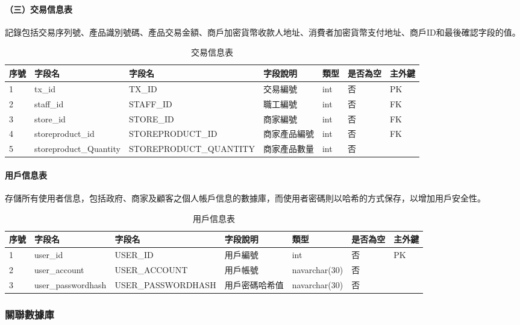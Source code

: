 			\paragraph{（三）交易信息表}記錄包括交易序列號、產品識別號碼、產品交易金額、商戶加密貨幣收款人地址、消費者加密貨幣支付地址、商戶ID和最後確認字段的值。
				\begin{table}[htbp]
				\centering
				\caption{交易信息表}
				\label{tx}
				\begin{tabular}{|l|l|l|l|l|l|l|}
				\hline
				序號 & 字段名 & 字段名 & 字段說明 & 類型 & 是否為空 & 主外鍵 \\ \hline
				1 & tx\_id & TX\_ID & 交易編號 & int & 否 & PK \\ \hline
				2 & staff\_id & STAFF\_ID & 職工編號 & int & 否 & FK \\ \hline
				3 & store\_id & STORE\_ID & 商家編號 & int & 否 & FK \\ \hline
				4 & storeproduct\_id & STOREPRODUCT\_ID & 商家產品編號 & int & 否 & FK \\ \hline
				5 & storeproduct\_Quantity & STOREPRODUCT\_QUANTITY & 商家產品數量 & int & 否 &  \\ \hline
				\end{tabular}
			\end{table}

			\paragraph{用戶信息表}存儲所有使用者信息，包括政府、商家及顧客之個人帳戶信息的數據庫，而使用者密碼則以哈希的方式保存，以增加用戶安全性。
				\begin{table}[htbp]
				\centering
				\caption{用戶信息表}
				\label{user}
				\begin{tabular}{|l|l|l|l|l|l|l|}
				\hline
				序號 & 字段名 & 字段名 & 字段說明 & 類型 & 是否為空 & 主外鍵 \\ \hline
				1 & user\_id & USER\_ID & 用戶編號 & int & 否 & PK \\ \hline
				2 & user\_account & USER\_ACCOUNT & 用戶帳號 & navarchar(30) & 否 &  \\ \hline
				3 & user\_passwordhash & USER\_PASSWORDHASH & 用戶密碼哈希值 & navarchar(30) & 否 &  \\ \hline
				\end{tabular}
				\end{table}

		\subsubsection{關聯數據庫}

